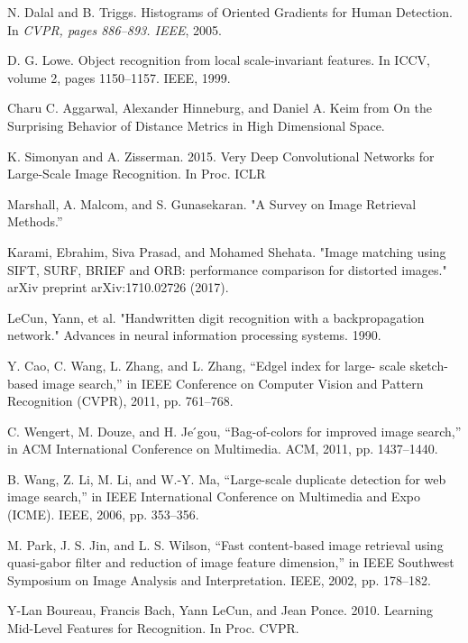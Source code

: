 \documentclass[10pt,twocolumn,letterpaper]{article}
\begin{document}
{\small
\begin{thebibliography}{10}\itemsep=-1pt

N. Dalal and B. Triggs.
\newblock Histograms of Oriented Gradients for Human Detection. 
\newblock In {\em CVPR, pages 886–893. IEEE}, 2005.

D. G. Lowe.
 \newblock Object recognition from local scale-invariant features. 
\newblock In ICCV, volume 2, pages 1150–1157. IEEE, 1999.

Charu C. Aggarwal, Alexander Hinneburg, and Daniel A.
\newblock Keim from On the Surprising Behavior of Distance Metrics in High Dimensional Space.

K. Simonyan and A. Zisserman. 2015.
\newblock Very Deep Convolutional Networks for Large-Scale Image Recognition. In Proc. ICLR

Marshall, A. Malcom, and S. Gunasekaran. 
\newblock "A Survey on Image Retrieval Methods.”

Karami, Ebrahim, Siva Prasad, and Mohamed Shehata. 
\newblock "Image matching using SIFT, SURF, BRIEF and ORB: performance comparison for distorted images." arXiv preprint arXiv:1710.02726 (2017).

LeCun, Yann, et al. 
\newblock "Handwritten digit recognition with a backpropagation network." 
\newblock Advances in neural information processing systems. 1990.

Y. Cao, C. Wang, L.
\newblock Zhang, and L. Zhang, “Edgel index for large- scale sketch-based image search,” 
\newblock in IEEE Conference on Computer Vision and Pattern Recognition (CVPR), 2011, pp. 761–768.

C. Wengert, M. Douze, and H. Je ́gou,
\newblock “Bag-of-colors for improved image search,” 
\newblock in ACM International Conference on Multimedia. ACM, 2011, pp. 1437–1440. 

B. Wang, Z. Li, M. Li, and W.-Y. Ma,
\newblock “Large-scale duplicate detection for web image search,”
\newblock in IEEE International Conference on Multimedia and Expo (ICME). IEEE, 2006, pp. 353–356. 

M. Park, J. S. Jin, and L. S. Wilson, 
\newblock “Fast content-based image retrieval using quasi-gabor filter and reduction of image feature dimension,” 
\newblock in IEEE Southwest Symposium on Image Analysis and Interpretation. IEEE, 2002, pp. 178–182.

Y-Lan Boureau, Francis Bach, Yann LeCun, and Jean Ponce. 2010. 
\newblock Learning Mid-Level Features for Recognition. 
\newblock In Proc. CVPR.


\end{thebibliography}}
\end{document}
